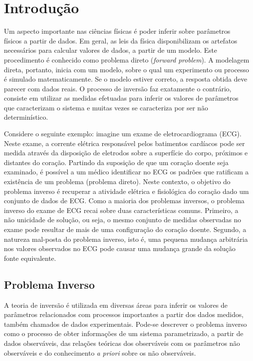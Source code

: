 \chapter{Introdução}
\label{cap:1intro}

Um aspecto importante nas ciências físicas é poder inferir sobre parâmetros
físicos a partir de dados. Em geral, as leis da física disponibilizam os
artefatos necessários para calcular valores de dados, a partir de um modelo.
Este procedimento é conhecido como problema direto (\textit{forward problem}).
A modelagem direta, portanto, inicia com um modelo, sobre o qual um experimento ou processo
é simulado matematicamente. Se o modelo estiver correto, a resposta
obtida deve parecer com dados reais. O processo de inversão faz exatamente o contrário,
consiste em utilizar as medidas efetuadas para inferir os valores de parâmetros que
caracterizam o sistema \citep{tarantola} e muitas vezes se caracteriza
por ser não determinístico.

Considere o seguinte exemplo: imagine um exame de eletrocardiograma (ECG). Neste exame,
a corrente elétrica responsável pelos batimentos cardíacos
pode ser medida através da disposição de eletrodos sobre a superfície do corpo,
próximos e distantes do coração. Partindo da suposição de que um coração doente
seja examinado, é possível a um médico identificar no ECG os padrões que ratificam
a existência de um problema (problema direto). Neste contexto, o objetivo do problema inverso
é recuperar a atividade elétrica e fisiológica do coração dado um conjunto de dados de ECG.
Como a maioria dos problemas inversos, o problema inverso do exame de ECG recai sobre duas características
comuns. Primeiro, a não unicidade de solução, ou seja, o mesmo conjunto de medidas
observadas no exame pode resultar de mais de uma configuração do coração doente. Segundo,
a natureza mal-posta do problema inverso, isto é, uma pequena mudança arbitrária nos
valores observados no ECG pode causar uma mudança grande da solução fonte equivalente.

\section{Problema Inverso}

A teoria de inversão é utilizada em diversas áreas para inferir os valores de
parâmetros relacionados com processos importantes a partir dos dados medidos,
também chamados de dados experimentais. Pode-se descrever o problema inverso
como o processo de obter informações de um sistema parametrizado, a partir de
dados observáveis, das relações teóricas dos observáveis com os parâmetros não
observáveis e do conhecimento \textit{a priori} sobre os não observáveis.

